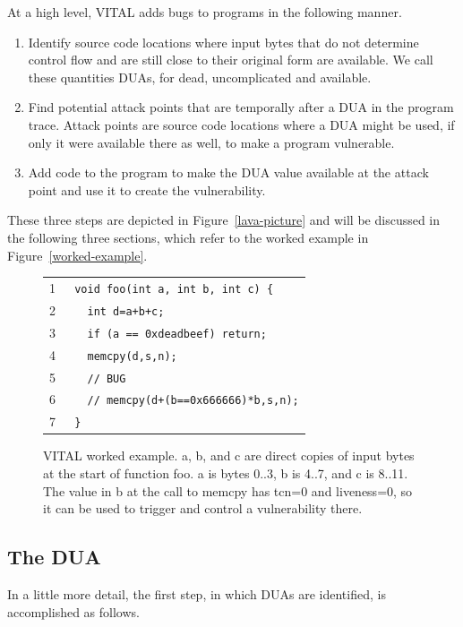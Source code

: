 
At a high level, VITAL adds bugs to programs in the following manner.

\begin {enumerate}
\item Identify source code locations where input bytes that do not determine control flow and are still close to their original form are available. 
We call these quantities DUAs, for dead, uncomplicated and available. 
\item Find potential attack points that are temporally after a DUA in the program trace.
Attack points are source code locations where a DUA might be used, if only it were available there as well, to make a program vulnerable. 
\item Add code to the program to make the DUA value available at the attack point and use it to create the vulnerability. 
\end{enumerate}

These three steps are depicted in Figure~\ref{lava-picture} and will be discussed in the following three sections,
which refer to the worked example in Figure~\ref{worked-example}.


\begin{figure} 
\begin{tabular}{ll}
1 & \verb+ void foo(int a, int b, int c) {+ \\
2 & \verb-   int d=a+b+c;- \\
3 & \verb+   if (a == 0xdeadbeef) return;+ \\ 
4 & \verb+   memcpy(d,s,n);+ \\
5 & \verb_   // BUG_ \\
6 & \verb_   // memcpy(d+(b==0x666666)*b,s,n);_ \\
7 & \verb+ }+ \\
\end{tabular}
\caption{
VITAL worked example.  
a, b, and c are direct copies of input bytes at the start of function foo.
a is bytes 0..3, b is 4..7, and c is 8..11.
The value in b at the call to memcpy has tcn=0 and liveness=0,
so it can be used to trigger and control a vulnerability there.
}
\label{fig:worked-example}
\end{figure}



\subsection {The DUA}

In a little more detail, the first step, in which DUAs are identified, is accomplished as follows.  

